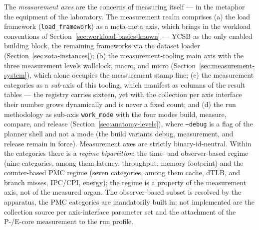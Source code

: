 \begin{nurkurz}
The \emph{measurement axes} are the concerns of measuring itself --- in the metaphor the equipment of the
laboratory. The measurement realm comprises (a) the load framework (\texttt{load\_framework}) as a
meta-meta axis, which brings in the workload conventions of Section~\ref{sec:workload-basics-known} ---
YCSB as the only enabled building block, the remaining frameworks via the dataset loader
(Section~\ref{sec:sota-instances}); (b) the measurement-tooling main axis with the three measurement
levels wallclock, macro, and micro (Section~\ref{sec:measurement-system}), which alone occupies the
measurement stamp line; (c) the measurement categories as a \emph{sub}-axis of this tooling, which
manifest as columns of the result tables --- the registry carries sixteen, yet with the collection per
axis interface their number grows dynamically and is never a fixed count; and (d) the run methodology as
sub-axis \texttt{work\_mode} with the four modes build, measure, compare, and release
(Section~\ref{sec:anatomy-levels}), where \texttt{--debug} is a flag of the planner shell and not a mode
(the build variants debug, measurement, and release remain in force). Measurement axes are strictly
binary-id-neutral. Within the categories
there is a \emph{regime bipartition}: the time- and observer-based regime (nine categories, among them
latency, throughput, memory footprint) and the counter-based PMC regime (seven categories, among them
cache, dTLB, and branch misses, IPC/CPI, energy); the regime is a property of the measurement axis, not of
the measured organ. The observer-based subset is resolved by the apparatus, the PMC categories are
mandatorily built in; not implemented are the collection source per axis-interface parameter set and the
attachment of the P-/E-core measurement to the run profile.
\end{nurkurz}


